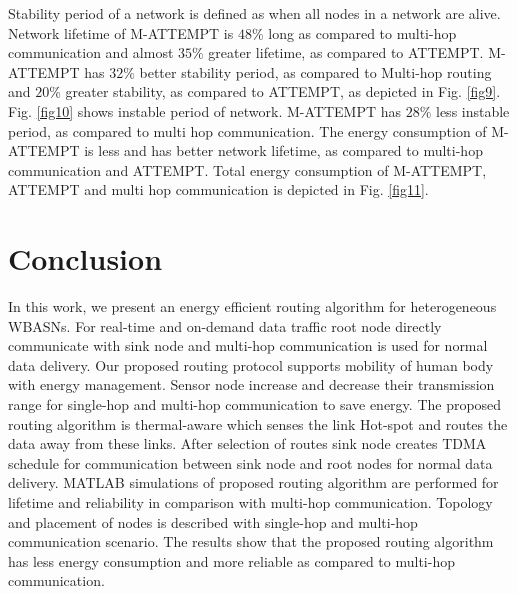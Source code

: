 \documentclass[journal]{IEEEtran}
\begin{document}
Stability period of a network is defined as when all nodes in a network are alive. Network lifetime of M-ATTEMPT is $48\%$ long as compared to multi-hop communication and almost $35\%$ greater lifetime, as compared to ATTEMPT. M-ATTEMPT has $32\%$ better stability period, as compared to Multi-hop routing and $20\%$ greater stability, as compared to ATTEMPT, as depicted in Fig. \ref{fig9}. Fig. \ref{fig10} shows instable period of network. M-ATTEMPT has $28\%$ less instable period, as compared to multi hop communication. The energy consumption of M-ATTEMPT is less and has better network lifetime, as compared to multi-hop communication and ATTEMPT. Total energy consumption of M-ATTEMPT, ATTEMPT and multi hop communication is depicted in  Fig. \ref{fig11}.

\section{Conclusion}
In this work, we present an energy efficient routing algorithm for heterogeneous WBASNs. For real-time and on-demand data traffic root node directly communicate with sink node and multi-hop communication is used for normal data delivery. Our proposed routing protocol supports mobility of human body with energy management. Sensor node increase and decrease their transmission range for single-hop and multi-hop communication to save energy. The proposed routing algorithm is thermal-aware which senses the link Hot-spot and routes the data away from these links. After selection of routes sink node creates TDMA schedule for communication between sink node and root nodes for normal data delivery. MATLAB simulations of proposed routing algorithm are performed for lifetime and reliability in comparison with multi-hop communication. Topology and placement of nodes is described with single-hop and multi-hop communication scenario. The results show that the proposed routing algorithm has less energy consumption and more reliable as compared to multi-hop communication.




\end{document}
